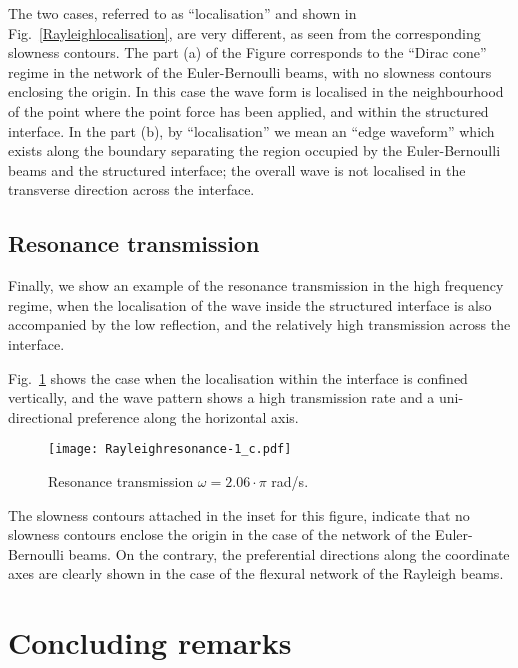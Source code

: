 \documentclass[11pt]{article}
\begin{document}
The two cases, referred to as ``localisation'' and shown in Fig.~\ref{Rayleighlocalisation}, are very different, as seen from the corresponding slowness contours. The part (a) of the Figure corresponds to the ``Dirac cone'' regime in the network of the Euler-Bernoulli beams, with no slowness contours enclosing the origin. In this case the wave form is localised in the neighbourhood of the point where the point force has been applied, and within the structured interface. In the part (b), by ``localisation'' we mean an ``edge waveform'' which exists along the boundary separating the region occupied by the Euler-Bernoulli beams and the structured interface; the overall wave is not localised in the transverse direction across the interface.

\subsection{Resonance transmission}

Finally, we show an example of the resonance transmission in the high frequency regime, when the localisation of the wave inside the structured interface is also accompanied by the low reflection, and the relatively high transmission across the interface.

Fig.~\ref{Rayleighresonance} shows the case when the localisation within the interface is  confined vertically,
and the wave pattern shows a high transmission rate and a uni-directional preference along the horizontal axis.

\begin{figure}[!htb]
\centering
\texttt{[image: Rayleighresonance-1\_c.pdf]}
\caption{\footnotesize
Resonance transmission $\omega=2.06\!\cdot\!\pi$ rad/s.}
\label{Rayleighresonance}
\end{figure}

The slowness contours attached in the inset for this figure, indicate that no slowness contours enclose the origin in the case of the network of the Euler-Bernoulli beams. On the contrary, the preferential directions along the coordinate axes are clearly shown in the case of the flexural network of the Rayleigh beams.

\section{Concluding remarks}
\label{sec05}
\end{document}
